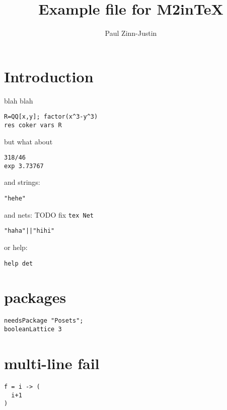 \documentclass[12pt,a4paper]{amsart}
\title{Example file for M2inTeX}
\author{Paul Zinn-Justin}
\begin{document}
\maketitle

\section{Introduction}
blah blah
\begin{verbatim}
R=QQ[x,y]; factor(x^3-y^3)
res coker vars R
\end{verbatim}
but what about
\begin{verbatim}
318/46
exp 3.73767
\end{verbatim}
and strings:
\begin{verbatim}
"hehe"
\end{verbatim}
and nets: TODO fix {\tt tex Net}
\begin{verbatim}
"haha"||"hihi"
\end{verbatim}
or help:
\begin{verbatim}
help det
\end{verbatim}

\section{packages}
\begin{verbatim}
needsPackage "Posets";
booleanLattice 3
\end{verbatim}

\section{multi-line fail}
\begin{verbatim}
f = i -> (
  i+1
)
\end{verbatim}
\end{document}
